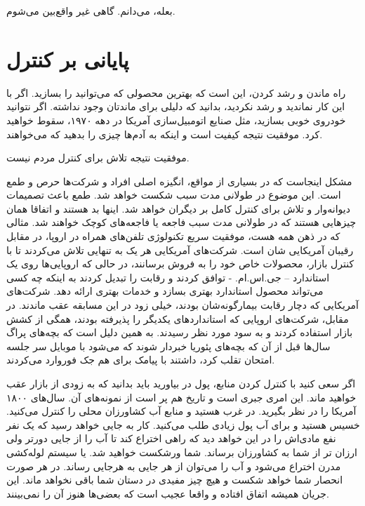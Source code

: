 بعله، می‌دانم. گاهی غیر واقع‌بین می‌شوم.

\section{پایانی بر کنترل}
راه ماندن و رشد کردن، این است که بهترین محصولی که می‌توانید را
بسازید. اگر با این کار نماندید و رشد نکردید، بدانید که دلیلی برای
ماندتان وجود نداشته. اگر نتوانید خودروی خوبی بسازید، مثل صنایع
اتومبیل‌سازی آمریکا در دهه ۱۹۷۰، سقوط خواهید کرد. موفقیت نتیجه کیفیت
است و اینکه به آدم‌ها چیزی را بدهید که می‌خواهند.

موفقیت نتیجه تلاش برای کنترل مردم نیست.

مشکل اینجاست که در بسیاری از مواقع، انگیزه اصلی افراد و شرکت‌ها حرص و
طمع است. این موضوع در طولانی مدت سبب شکست خواهد شد. طمع باعث تصمیمات
دیوانه‌وار و تلاش برای کنترل کامل بر دیگران خواهد شد. اینها بد هستند و
اتفاقا همان چیزهایی هستند که در طولانی مدت سبب فاجعه یا فاجعه‌های کوچک
خواهند شد. مثالی که در ذهن همه هست، موفقیت سریع تکنولوژی تلفن‌های همراه
در اروپا، در مقابل رقیبان آمریکایی شان است. شرکت‌های آمریکایی هر یک به
تنهایی تلاش می‌کردند تا با کنترل بازار، محصولات خاص خود را به فروش
برسانند، در حالی که اروپایی‌ها روی یک استاندارد – جی.اس.ام. - توافق
کردند و رقابت را تبدیل کردند به اینکه چه کسی می‌تواند محصول استاندارد
بهتری بسازد و خدمات بهتری ارائه دهد. شرکت‌های آمریکایی که دچار رقابت
بیمارگونه‌شان بودند، خیلی زود در این مسابقه عقب ماندند. در مقابل،
شرکت‌های اروپایی که استانداردهای یکدیگر را پذیرفته بودند، همگی از کشش
بازار استفاده کردند و به سود مورد نظر رسیدند. به همین دلیل است که
بچه‌های پراگ سال‌ها قبل از آن که بچه‌های
پئوریا خبردار شوند که
می‌شود با موبایل سر جلسه امتحان تقلب کرد، داشتند با پیامک برای هم جک
فوروارد می‌کردند.

اگر سعی کنید با کنترل کردن منابع، پول در بیاورید باید بدانید که به
زودی از بازار عقب خواهید ماند. این امری جبری است و تاریخ هم پر است از
نمونه‌های آن. سال‌های ۱۸۰۰ آمریکا را در نظر بگیرید. در غرب هستید و منابع
آب کشاورزان محلی را کنترل می‌کنید. خسیس هستید و برای آب پول زیادی طلب
می‌کنید. کار به جایی خواهد رسید که یک نفر نفع مادی‌اش را در این خواهد
دید که راهی اختراع کند تا آب را از جایی دورتر ولی ارزان تر از شما به
کشاورزان برساند. شما ورشکست خواهید شد. یا سیستم لوله‌کشی مدرن اختراع
می‌شود و آب را می‌توان از هر جایی به هرجایی رساند. در هر صورت انحصار شما
خواهد شکست و هیچ چیز مفیدی در دستان شما باقی نخواهد ماند. این جریان
همیشه اتفاق افتاده و واقعا عجیب است که بعضی‌ها هنوز آن را نمی‌بینند.


